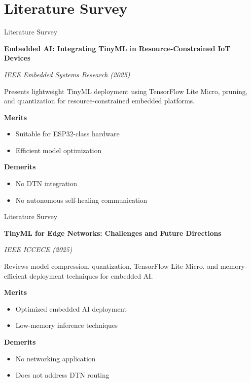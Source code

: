 \documentclass[11pt,aspectratio=43]{beamer}
\begin{document}
\section{Literature Survey}
\begin{frame}{Literature Survey}

\textbf{Embedded AI: Integrating TinyML in Resource-Constrained IoT Devices}

\textit{IEEE Embedded Systems Research (2025)}

\vspace{0.2cm}

Presents lightweight TinyML deployment using TensorFlow Lite Micro, pruning, and quantization for resource-constrained embedded platforms.

\vspace{0.2cm}

\textbf{Merits}
\begin{itemize}
    \item Suitable for ESP32-class hardware
    \item Efficient model optimization
\end{itemize}

\textbf{Demerits}
\begin{itemize}
    \item No DTN integration
    \item No autonomous self-healing communication
\end{itemize}

\end{frame}
\begin{frame}{Literature Survey}

\textbf{TinyML for Edge Networks: Challenges and Future Directions}

\textit{IEEE ICCECE (2025)}

\vspace{0.2cm}

Reviews model compression, quantization, TensorFlow Lite Micro, and memory-efficient deployment techniques for embedded AI.

\vspace{0.2cm}

\textbf{Merits}
\begin{itemize}
    \item Optimized embedded AI deployment
    \item Low-memory inference techniques
\end{itemize}

\textbf{Demerits}
\begin{itemize}
    \item No networking application
    \item Does not address DTN routing
\end{itemize}

\end{frame}
\end{document}

